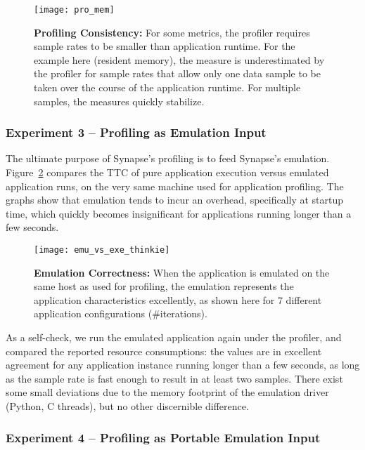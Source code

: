 \documentclass[10pt, conference, compsocconf]{IEEEtran}
\newcommand{\synapse}{Synapse\xspace}
\begin{document}
 \begin{figure}[t]
   \centering
   \texttt{[image: pro\_mem]}
   \caption{\textbf{Profiling Consistency:} For some metrics, the profiler
     requires sample rates to be smaller than application runtime.  For the
     example here (resident memory), the measure is underestimated by the
     profiler for sample rates that allow only one data sample to be taken over
     the course of the application runtime.  For multiple samples, the measures
     quickly stabilize.
     \label{fig:pro_mem} 
   } 
   \end{figure}


 \subsubsection*{Experiment 3 -- Profiling as Emulation Input}

 The ultimate purpose of \synapse's profiling is to feed \synapse's
 emulation.  Figure~\ref{fig:exe_emu_thinkie} compares the TTC of pure
 application execution versus emulated application runs, on the very
 same machine used for application profiling.  The graphs show that
 emulation tends to incur an overhead, specifically at startup time,
 which quickly becomes insignificant for applications running
 longer than a few seconds.

 \begin{figure}[t]
   \centering
   \texttt{[image: emu\_vs\_exe\_thinkie]}
   \caption{\textbf{Emulation Correctness:} When the application is emulated on
     the same host as used for profiling, the emulation represents the
     application characteristics excellently, as shown here for 7
     different application configurations (\#iterations).
     \label{fig:exe_emu_thinkie} 
   } 
   \end{figure}

 As a self-check, we run the emulated application again under the
 profiler, and compared the reported resource consumptions: the values
 are in excellent agreement for any application instance running
 longer than a few seconds, as long as the sample rate is fast enough
 to result in at least two samples.  There exist some small deviations
 due to the memory footprint of the emulation driver (Python, C
 threads), but no other discernible difference.

 \subsubsection*{Experiment 4 -- Profiling as Portable Emulation Input}
\end{document}
